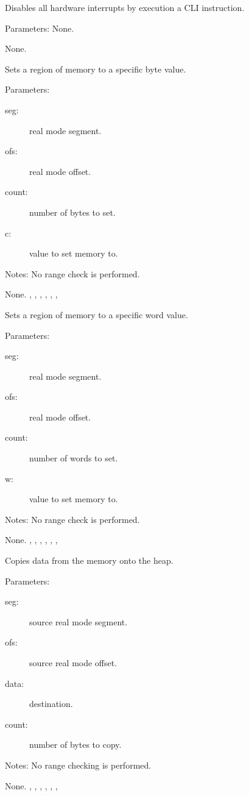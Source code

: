 {Disables all hardware interrupts by execution a CLI instruction.

Parameters: None.
}{None.}{}

{Sets a region of \dos memory to a specific byte value.

Parameters:
\begin{description}
\item[seg:\ ] real mode segment.
\item[ofs:\ ] real mode offset. 
\item[count:\ ] number of bytes to set.
\item[c:\ ] value to set memory to.
\end{description}

Notes: No range check is performed.
}
{ None.}{ 
,
, 
, 
, 
,
,
 }

\html{}

{Sets a region of \dos memory to a specific word value.

Parameters: 
\begin{description}
\item[seg:\ ] real mode segment.
\item[ofs:\ ] real mode offset. 
\item[count:\ ] number of words to set.
\item[w:\ ] value to set memory to.
\end{description}

Notes: No range check is performed.
}{ None.}{ 
,
, 
, 
, 
, 
,
 }

{Copies data from the \dos memory onto the heap.

Parameters:
\begin{description}
\item[seg:\ ] source real mode segment.
\item[ofs:\ ] source real mode offset.
\item[data:\ ] destination. 
\item[count:\ ] number of bytes to copy.
\end{description}

Notes: No range checking is performed.
}{ None. }
{,
,
,
,
,
, 
  }

